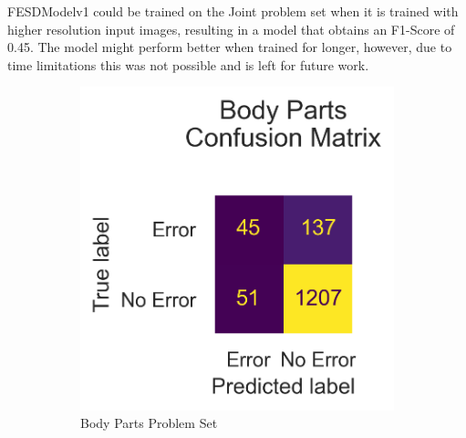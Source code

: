 

FESDModelv1 could be trained on the Joint problem set when it is trained with higher resolution input images, resulting in a model that obtains an F1-Score of 0.45. The model might perform better when trained for longer, however, due to time limitations this was not possible and is left for future work.

\begin{figure}[!htbp]
  \centering
  \begin{subfigure}[b]{0.4\linewidth}
      \centering
      \includegraphics[width=\textwidth]{figures/results_hi/v1/confusion/body_parts_together.png}
      \caption[]{Body Parts Problem Set}
      \label{fig:hi_bp_conf_v1}
  \end{subfigure}
  \hfill
  \begin{subfigure}[b]{0.4\linewidth}
      \centering

\end{subfigure}
\end{figure}
